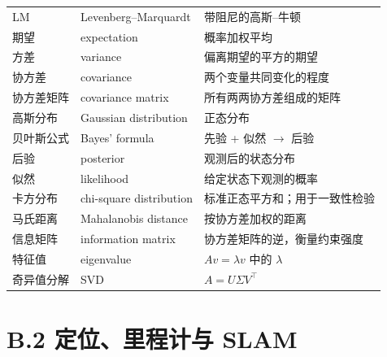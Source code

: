 \begin{table}[htbp]
\begin{tabular}{llp{6.6cm}}
    LM & Levenberg--Marquardt & 带阻尼的高斯--牛顿 \\
    期望 & expectation & 概率加权平均 \\
    方差 & variance & 偏离期望的平方的期望 \\
    协方差 & covariance & 两个变量共同变化的程度 \\
    协方差矩阵 & covariance matrix & 所有两两协方差组成的矩阵 \\
    高斯分布 & Gaussian distribution & 正态分布 \\
    贝叶斯公式 & Bayes' formula & 先验 + 似然 $\to$ 后验 \\
    后验 & posterior & 观测后的状态分布 \\
    似然 & likelihood & 给定状态下观测的概率 \\
    卡方分布 & chi-square distribution & 标准正态平方和；用于一致性检验 \\
    马氏距离 & Mahalanobis distance & 按协方差加权的距离 \\
    信息矩阵 & information matrix & 协方差矩阵的逆，衡量约束强度 \\
    特征值 & eigenvalue & $Av=\lambda v$ 中的 $\lambda$ \\
    奇异值分解 & SVD & $A=U\Sigma V^{\top}$ \\
    \bottomrule
  \end{tabular}
\end{table}

\section*{B.2 定位、里程计与 SLAM}

